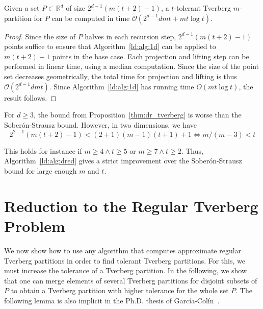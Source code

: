 \documentclass[oribibl,envcountsame,envcountsect]{llncs}
\newcommand{\bo}[1]{\mathcal{O}(#1)}
\newcommand{\real}{\mathbb{R}}
\newcommand{\Soberon}{Sober\'{o}n}
\newcommand{\GarciaColin}{Garc\'{i}a-Col\'{i}n}
\begin{document}
\begin{theorem}
  Given a set $P\subset \real^{d}$ of size $2^{d-1}(m(t+2) - 1)$,
  a $t$-tolerant Tverberg $m$-partition
  for $P$ can be computed in time $\bo{2^{d-1}dmt + mt \log t}$.
\end{theorem}
\begin{proof}
  Since the size of $P$ halves in each recursion step, $2^{d-1}(m(t+2) - 1)$ points
  suffice to ensure that Algorithm~\ref{ld:alg:1d} can be applied to $m(t+2)-1$
  points in the base case. Each projection and lifting step can be performed in linear
  time, using a median computation. Since the size of the point set decreases
  geometrically, the total time for projection and lifting is thus $\bo{2^{d-1}dmt}$.
  Since Algorithm~\ref{ld:alg:1d} has running time $O(mt\log t)$, the result follows.
\end{proof}

For $d\geq 3$, the bound from Proposition~\ref{thm:dr_tverberg}
is worse than the \Soberon{}-Strausz bound. However, in two dimensions, we have
\[
  2^{2-1}(m(t+2)-1) <  (2+1)(m-1)(t+1) + 1 \Leftrightarrow m/(m-3) <   t
\]

This holds for instance if $ m\geq 4 \wedge t\geq 5 $ or $m\geq 7 \wedge t\geq 2$.
Thus, Algorithm~\ref{ld:alg:dred} gives a strict improvement over
the \Soberon{}-Strausz bound for large enough $m$ and $t$.

\section{Reduction to the Regular Tverberg Problem}\label{sec:redregtver}

We now show how to use any algorithm that computes approximate
regular Tverberg partitions in order to find tolerant Tverberg partitions.
For this, we must increase the tolerance of a Tverberg partition.
In the following, we show that one can merge elements of several
Tverberg partitions for disjoint subsets of $P$
to obtain a Tverberg partition with higher tolerance for the whole set $P$.
The following lemma is also implicit in the Ph.D. thesis of
\GarciaColin{}~\cite{GarciaColin2007}.
\end{document}
